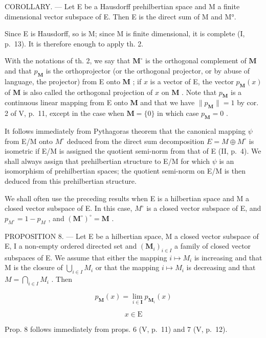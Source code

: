 COROLLARY. --- Let E be a Hausdorff prehilbertian space and M a finite dimensional vector subspace of E. Then E is the direct sum of M and M°.

Since E is Hausdorff, so is M; since M is finite dimensional, it is complete (I, p.~13). It is therefore enough to apply th. 2.

With the notations of th. 2, we say that \(\mathbf{M}^{\circ}\) is the orthogonal complement of \(\mathbf{M}\) and that \(p_{\mathbf{M}}\) is the orthoprojector (or the orthogonal projector, or by abuse of language, the projector) from E onto \(\mathbf{M}\) ; if \(x\) is a vector of E, the vector \(p_{\mathbf{M}}(x)\) of \(\mathbf{M}\) is also called the orthogonal projection of \(x\) on \(\mathbf{M}\) . Note that \(p_{\mathbf{M}}\) is a continuous linear mapping from E onto \(\mathbf{M}\) and that we have \(\| p_{\mathbf{M}} \| = 1\) by cor. 2 of V, p.~11, except in the case when \(\mathbf{M} = \{0\}\) in which case \(p_{\mathbf{M}} = 0\) .

It follows immediately from Pythagoras theorem that the canonical mapping \(\psi\) from E/M onto \(M^{\circ}\) deduced from the direct sum decomposition \(E = M \oplus M^{\circ}\) is isometric if E/M is assigned the quotient semi-norm from that of E (II, p.~4). We shall always assign that prehilbertian structure to E/M for which \(\psi\) is an isomorphism of prehilbertian spaces; the quotient semi-norm on E/M is then deduced from this prehilbertian structure.

We shall often use the preceding results when E is a hilbertian space and M a closed vector subspace of E. In this case, \(M^{\circ}\) is a closed vector subspace of E, and \(p_{M^{\circ}} = 1 - p_{M}\) , and \((\mathbf{M}^{\circ})^{\circ} = \mathbf{M}\) .

PROPOSITION 8. --- Let E be a hilbertian space, M a closed vector subspace of E, I a non-empty ordered directed set and \((\mathbf{M}_{i})_{i\in I}\) a family of closed vector subspaces of E. We assume that either the mapping \(i\mapsto M_{i}\) is increasing and that M is the closure of \(\bigcup_{i\in I}M_{i}\) or that the mapping \(i\mapsto M_{i}\) is decreasing and that \(M=\bigcap_{i\in I}M_{i}\) . Then

\[
p _ {\mathbf {M}} (x) = \lim _ {i \in \mathbf {I}} p _ {\mathbf {M} _ {i}} (x)
\]

\[
x \in \mathrm{E}
\]

Prop. 8 follows immediately from props. 6 (V, p.~11) and 7 (V, p.~12).

